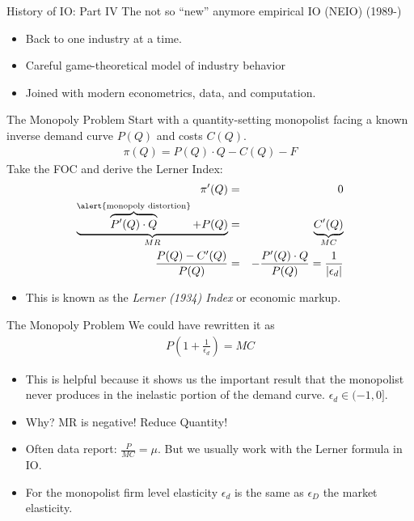 \begin{frame}{History of IO: Part IV}
The not so ``new'' anymore empirical IO (NEIO) (1989-)
\begin{itemize}
\item Back to one industry at a time.
\item Careful game-theoretical model of industry behavior
\item Joined with modern econometrics, data, and computation.
\end{itemize}
\end{frame}


\begin{frame}{The Monopoly Problem}
Start with a quantity-setting monopolist facing a known inverse demand curve $P(Q)$ and costs $C(Q)$.
\begin{eqnarray*}
\pi(Q) = P(Q) \cdot Q - C(Q) -  F
\end{eqnarray*}
Take the FOC and derive the \alert{Lerner Index}:
\begin{eqnarray*}
\pi'(Q) &=& 0  \\
 \underbrace{\overbrace{P'(Q) \cdot Q}^{\text{\alert{monopoly distortion}}}+ P(Q)}_{MR}  &=&  \underbrace{C'(Q)}_{MC} \\
  \frac{P(Q) - C'(Q)}{P(Q)} &=& - \frac{P'(Q) \cdot Q}{P(Q)} = \frac{1}{|\epsilon_d|}
\end{eqnarray*}
\begin{itemize}
\item This is known as the \textit{Lerner (1934) Index} or \alert{economic markup}.
\end{itemize}
\end{frame}

\begin{frame}{The Monopoly Problem}
We could have rewritten it as 
\begin{eqnarray*}
P \left( 1+\frac{1}{\epsilon_d} \right) = MC
\end{eqnarray*}
\begin{itemize}
\item This is helpful because it shows us the important result that the monopolist never produces in the inelastic portion of the demand curve. $\epsilon_d \in (-1,0]$.
\item Why? MR is negative! Reduce Quantity!
\item Often data report: $\frac{P}{MC}= \mu$. But we usually work with the Lerner formula in IO.
\item For the monopolist firm level elasticity $\epsilon_d$ is the same as $\epsilon_D$ the market elasticity.
\end{itemize}
\end{frame}



